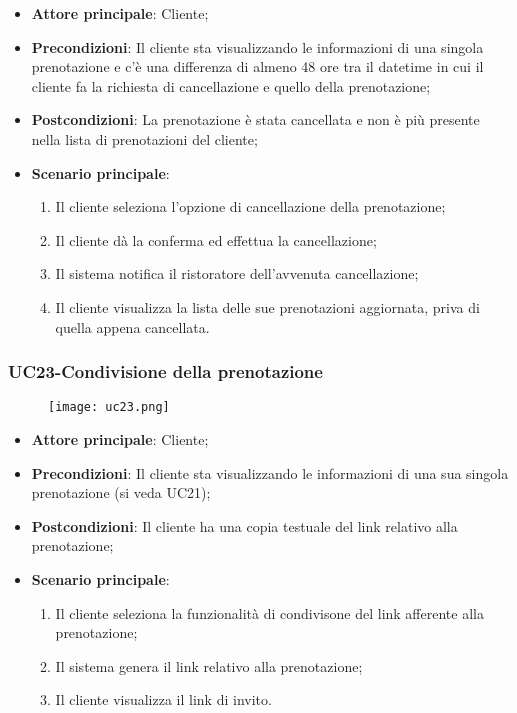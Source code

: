 \begin{itemize}
\item \textbf{Attore principale}: Cliente;
\item \textbf{Precondizioni}: Il cliente sta visualizzando le informazioni di una singola prenotazione e c'è una differenza di almeno 48 ore tra il datetime in cui il cliente fa la richiesta di cancellazione e quello della prenotazione;
\item \textbf{Postcondizioni}: La prenotazione è stata cancellata e non è più presente nella lista di prenotazioni del cliente;
\item \textbf{Scenario principale}:
\begin{enumerate}
\item Il cliente seleziona l'opzione di cancellazione della prenotazione;
\item Il cliente dà la conferma ed effettua la cancellazione;
\item Il sistema notifica il ristoratore dell'avvenuta cancellazione;
\item Il cliente visualizza la lista delle sue prenotazioni aggiornata, priva di quella appena cancellata.
\end{enumerate}
\end{itemize}

\subsubsection{UC23-Condivisione della prenotazione}
\begin{figure}[h] \texttt{[image: uc23.png]} \end{figure}

\begin{itemize}
\item \textbf{Attore principale}: Cliente;
\item \textbf{Precondizioni}: Il cliente sta visualizzando le informazioni di una sua singola prenotazione (si veda UC21);
\item \textbf{Postcondizioni}: Il cliente ha una copia testuale del link relativo alla prenotazione;
\item \textbf{Scenario principale}:
\begin{enumerate}
\item Il cliente seleziona la funzionalità di condivisone del link afferente alla prenotazione;
\item Il sistema genera il link relativo alla prenotazione;
\item Il cliente visualizza il link di invito.
\end{enumerate}
\end{itemize}

